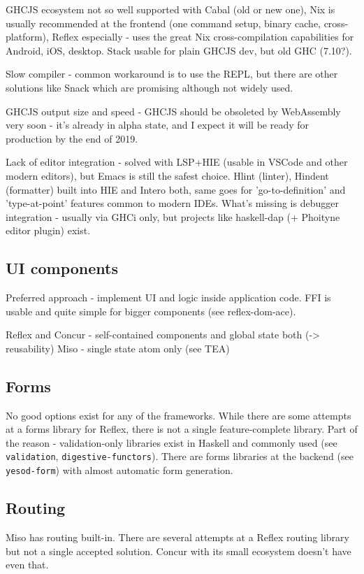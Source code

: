 \documentclass[english,odsaz]{fitthesis}
\begin{document}
GHCJS ecosystem not so well supported with Cabal (old or new one), Nix is
usually recommended at the frontend (one command setup, binary cache,
cross-platform), Reflex especially - uses the great Nix cross-compilation
capabilities for Android, iOS, desktop. Stack usable for plain GHCJS dev, but
old GHC (7.10?).

Slow compiler - common workaround is to use the REPL, but there are other
solutions like Snack which are promising although not widely used.

GHCJS output size and speed - GHCJS should be obsoleted by WebAssembly very
soon - it's already in alpha state, and I expect it will be ready for
production by the end of 2019.

Lack of editor integration - solved with LSP+HIE (usable in VSCode and other modern
editors), but Emacs is still the safest choice. Hlint (linter), Hindent
(formatter) built into HIE and Intero both, same goes for 'go-to-definition' and
'type-at-point' features common to modern IDEs. What's missing is debugger
integration - usually via GHCi only, but projects like haskell-dap (+ Phoityne
editor plugin) exist.

\subsection{UI components}
\label{sec:org337bc77}
Preferred approach - implement UI and logic inside application code. FFI is
usable and quite simple for bigger components (see reflex-dom-ace).

Reflex and Concur - self-contained components and global state both (-> reusability)
Miso - single state atom only (see TEA)

\subsection{Forms}
\label{sec:org6b15749}
No good options exist for any of the frameworks. While there are some attempts
at a forms library for Reflex, there is not a single feature-complete
library. Part of the reason - validation-only libraries exist in Haskell and
commonly used (see \texttt{validation}, \texttt{digestive-functors}). There are forms libraries at
the backend (see \texttt{yesod-form}) with almost automatic form generation.

\subsection{Routing}
\label{sec:orgf41fa22}
Miso has routing built-in. There are several attempts at a Reflex routing
library but not a single accepted solution. Concur with its small ecosystem
doesn't have even that.
\end{document}
